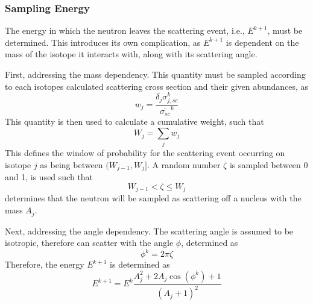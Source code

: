 \subsubsection{Sampling Energy}
\label{sec:sampling-energy-ms}
The energy in which the neutron leaves the scattering event, i.e., $E^{k+1}$, must be determined. This introduces its own complication, as $E^{k+1}$ is dependent on the mass of the isotope it interacts with, along with its scattering angle. 

First, addressing the mass dependency. This quantity must be sampled according to each isotopes calculated scattering cross section and their given abundances, as
\begin{equation}
    w_{j} = \frac{\delta_j \sigma_{j,sc}^{k} }{\overline{\sigma_{sc}}^{k}}
\end{equation}
This quantity is then used to calculate a cumulative weight, such that
\begin{equation}
    W_j = \sum_{j} w_j
\end{equation}
This defines the window of probability for the scattering event occurring on isotope $j$ as being between $(W_{j-1}, W_{j}]$.
A random number $\zeta$ is sampled between 0 and 1, is used such that
\begin{equation}
    W_{j-1} < \zeta \leq W_{j}
\end{equation}
determines that the neutron will be sampled as scattering off a nucleus with the mass $A_j$.

Next, addressing the angle dependency. The scattering angle is assumed to be isotropic, therefore can scatter with the angle $\phi$, determined as
\begin{equation}
    \phi^k = 2\pi\zeta
\end{equation}
Therefore, the energy $E^{k+1}$ is determined as
\begin{equation}
    E^{k+1} = E^{k} \frac{A_j^{2} + 2A_{j}\cos{\left(\phi^{k}\right) + 1}}{\left( A_{j} + 1 \right)^2}
\end{equation}

